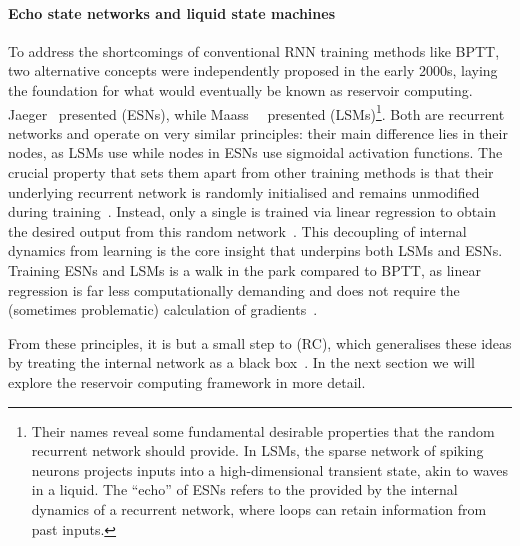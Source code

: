 \paragraph{Echo state networks and liquid state machines}
To address the shortcomings of conventional RNN training methods like BPTT, two alternative concepts were independently proposed in the early 2000s, laying the foundation for what would eventually be known as reservoir computing.
Jaeger~\cite{jaeger2001echo} presented  (ESNs), while Maass~\etal~\cite{maass_LSM} presented  (LSMs)\footnote{
	Their names reveal some fundamental desirable properties that the random recurrent network should provide.
	In LSMs, the sparse network of spiking neurons projects inputs into a high-dimensional transient state, akin to waves in a liquid.
	The ``echo'' of ESNs refers to the  provided by the internal dynamics of a recurrent network, where loops can retain information from past inputs.
}.
Both are recurrent networks and operate on very similar principles: their main difference lies in their nodes, as LSMs use  while nodes in ESNs use sigmoidal activation functions.
The crucial property that sets them apart from other training methods is that their underlying recurrent network is randomly initialised and remains unmodified during training~\cite{ReviewESNs,RC_Tensegrity}.
Instead, only a single  is trained via linear regression to obtain the desired output from this random network~\cite{D-LSM,D-ESN-Improved}.
This decoupling of internal dynamics from learning is the core insight that underpins both LSMs and ESNs.
Training ESNs and LSMs is a walk in the park compared to BPTT, as linear regression is far less computationally demanding and does not require the (sometimes problematic) calculation of gradients~\cite{D-ESN-Improved}. \par
From these principles, it is but a small step to  (RC), which generalises these ideas by treating the internal network as a black box~\cite{RC_unification,D-ESN-Improved,RC_Tensegrity}.
In the next section we will explore the reservoir computing framework in more detail.

